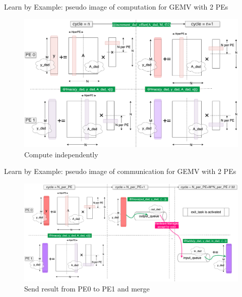 \documentclass[dvipdfmx, 11pt, aspectratio=169]{beamer}   %
\begin{document}
\begin{frame}{Learn by Example: pseudo image of computation for GEMV with 2 PEs}
\begin{figure}
    \includegraphics[scale=0.065]{img/csGEMV1.png}
    \caption{Compute independently}
\end{figure}
\end{frame}
\begin{frame}{Learn by Example: pseudo image of communication for GEMV with 2 PEs}
\vspace{-\baselineskip}
\begin{figure}
    \includegraphics[scale=0.063]{img/csGEMVsendrecv.png}
    \caption{Send result from PE0 to PE1 and merge}
\end{figure}
\end{frame}
\end{document}
